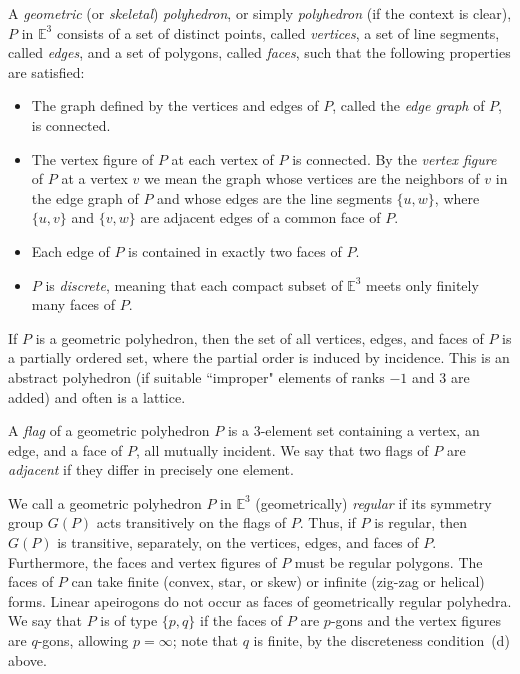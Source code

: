 \documentclass[12pt]{article}
\theoremstyle{definition}\newtheorem{definition}{Definition}[section]
\begin{document}
A \textit{geometric} (or \textit{skeletal}) \textit{polyhedron}, or simply \textit{polyhedron} (if the context is clear), $P$ in $\mathbb{E}^3$ consists of a set of distinct points, called \textit{vertices}, a set of line segments, called \textit{edges}, and a set of polygons, called \textit{faces}, such that the following properties are satisfied: 
\noindent
\begin{itemize}
\item[(a)] The graph defined by the vertices and edges of $P$, called the \textit{edge graph} of $P$, is connected.
    
\item[(b)] The vertex figure of $P$ at each vertex of $P$ is connected. By the \textit{vertex figure} of $P$ at a vertex $v$ we mean the graph whose vertices are the neighbors of $v$ in the edge graph of $P$ and whose edges are the line segments $\{u,w\}$, where $\{u,v\}$ and $\{v,w\}$ are adjacent edges of a common face of $P$. 
    
\item[(c)] Each edge of $P$ is contained in exactly two faces of $P$. 
    
\item[(d)] $P$ is \textit{discrete}, meaning that each compact subset of $\mathbb{E}^3$ meets only finitely many faces of $P$. 
\end{itemize}

If $P$ is a geometric polyhedron, then the set of all vertices, edges, and faces of $P$ is a partially ordered set, where the partial order is induced by incidence. This is an abstract polyhedron (if suitable ``improper" elements of ranks $-1$ and $3$ are added) and often is a lattice.
\smallskip

A \textit{flag} of a geometric polyhedron $P$ is a 3-element set containing a vertex, an edge, and a face of $P$, all mutually incident. We say that two flags of $P$ are \textit{adjacent} if they differ in precisely one element. \smallskip

We call a geometric polyhedron $P$ in $\mathbb{E}^3$ (geometrically) \textit{regular} if its symmetry group $G(P)$ acts transitively on the flags of $P$. Thus, if $P$ is regular, then $G(P)$ is transitive, separately, on the vertices, edges, and faces of $P$. Furthermore, the faces and vertex figures of $P$ must be regular polygons. The faces of $P$ can take finite (convex, star, or skew) or infinite (zig-zag or helical) forms. Linear apeirogons do not occur as faces of geometrically regular polyhedra. We say that $P$ is of type $\{p,q\}$ if the faces of $P$ are $p$-gons and the vertex figures are $q$-gons, allowing $p=\infty$; note that $q$ is finite, by the discreteness condition~(d) above.\smallskip
\end{document}
